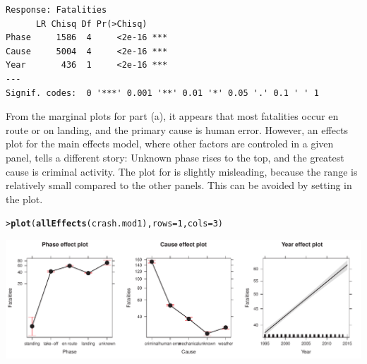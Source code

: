 \documentclass[10pt]{report}\usepackage[]{graphicx}\usepackage[]{color}
\makeatletter
\newcommand{\hlnum}[1]{\textcolor[rgb]{0.686,0.059,0.569}{#1}}%
\newcommand{\hlstd}[1]{\textcolor[rgb]{0.345,0.345,0.345}{#1}}%
\newcommand{\hlkwc}[1]{\textcolor[rgb]{0.333,0.667,0.333}{#1}}%
\newcommand{\hlkwd}[1]{\textcolor[rgb]{0.737,0.353,0.396}{\textbf{#1}}}%
\newenvironment{kframe}{%
 \def\at@end@of@kframe{}%
 \ifinner\ifhmode%
  \def\at@end@of@kframe{\end{minipage}}%
  \begin{minipage}{\columnwidth}%
 \fi\fi%
 \def\FrameCommand##1{\hskip\@totalleftmargin \hskip-\fboxsep
 \colorbox{shadecolor}{##1}\hskip-\fboxsep
     \hskip-\linewidth \hskip-\@totalleftmargin \hskip\columnwidth}%
 \MakeFramed {\advance\hsize-\width
   \@totalleftmargin\z@ \linewidth\hsize
   \@setminipage}}%
 {\par\unskip\endMakeFramed%
 \at@end@of@kframe}
\newenvironment{knitrout}{}{} %
\renewenvironment{knitrout}{\small\renewcommand{\baselinestretch}{.85}}{} %
\makeatother
\begin{document}
\begin{Exercises}
\begin{enumerate*}
\begin{ans}
\begin{knitrout}
\begin{kframe}
\begin{verbatim}
Response: Fatalities
      LR Chisq Df Pr(>Chisq)    
Phase     1586  4     <2e-16 ***
Cause     5004  4     <2e-16 ***
Year       436  1     <2e-16 ***
---
Signif. codes:  0 '***' 0.001 '**' 0.01 '*' 0.05 '.' 0.1 ' ' 1
\end{verbatim}
\end{kframe}
\end{knitrout}
    From the marginal plots for part (a), it appears that most fatalities occur en route or on landing,
    and the primary cause is human error.  However, an effects plot for the main effects model,
    where other factors are controled in a given panel, tells a different story: Unknown phase rises
    to the top, and the greatest cause is criminal activity.  The plot for  is slightly
    misleading, because the range is relatively small compared to the other panels.  This can be avoided
    by setting  in the plot.
\begin{knitrout}\footnotesize
{}\color{fgcolor}\begin{kframe}
\begin{alltt}
\hlstd{> }\hlkwd{plot}\hlstd{(}\hlkwd{allEffects}\hlstd{(crash.mod1),} \hlkwc{rows}\hlstd{=}\hlnum{1}\hlstd{,} \hlkwc{cols}\hlstd{=}\hlnum{3}\hlstd{)}
\end{alltt}
\end{kframe}

\centerline{\includegraphics[width=.9\textwidth]{soln/fig/ex11_3b2-1} }



\end{knitrout}

    \end{ans}
    

\end{enumerate*}
\end{Exercises}
\end{document}
